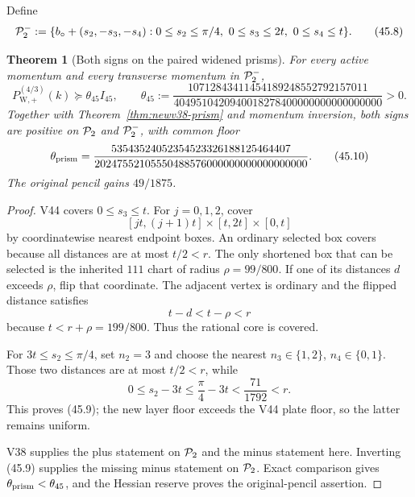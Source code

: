 \documentclass[11pt,oneside]{article}
\newtheorem{theorem}{Theorem}[section]
\theoremstyle{definition}
\theoremstyle{remark}
\begin{document}
Define
\[
 {\cal P}_{2}^{-}:=
 \{b_\circ+(s_2,-s_3,-s_4):
 0\le s_2\le\pi/4,\ 0\le s_3\le2t,\ 0\le s_4\le t\}.  \tag{45.8}
\]

\begin{theorem}[Both signs on the paired widened prisms]
\label{thm:newv45-paired-prisms}
For every active momentum and every transverse momentum in
\({\cal P}_2^-\),
\[
 P_{\mathrm W,+}^{(4/3)}(k)
 \succeq\theta_{45}I_{45},\qquad
 \theta_{45}:=
 \frac{10712843411454189248552792157011}
 {4049510420940018278400000000000000000}>0.            \tag{45.9}
\]
Together with Theorem~\ref{thm:newv38-prism} and momentum
inversion, both signs are positive on \({\cal P}_2\) and
\({\cal P}_2^-\), with common floor
\[
 \theta_{\rm prism}
 =\frac{53543524052354523326188125464407}
 {20247552105550488576000000000000000000}.             \tag{45.10}
\]
The original pencil gains \(49/1875\).
\end{theorem}

\begin{proof}
V44 covers \(0\le s_3\le t\).  For \(j=0,1,2\), cover
\[
 [jt,(j+1)t]\times[t,2t]\times[0,t]                   \tag{45.11}
\]
by coordinatewise nearest endpoint boxes.  An ordinary selected
box covers because all distances are at most \(t/2<r\).  The only
shortened box that can be selected is the inherited \(111\) chart
of radius \(\rho=99/800\).  If one of its distances \(d\) exceeds
\(\rho\), flip that coordinate.  The adjacent vertex is ordinary
and the flipped distance satisfies
\[
 t-d<t-\rho<r
\]
because \(t<r+\rho=199/800\).  Thus the rational core is covered.

For \(3t\le s_2\le\pi/4\), set \(n_2=3\) and choose the nearest
\(n_3\in\{1,2\}\), \(n_4\in\{0,1\}\).  Those two distances are at
most \(t/2<r\), while
\[
 0\le s_2-3t\le\frac{\pi}{4}-3t
 <\frac{71}{1792}<r.                                   \tag{45.12}
\]
This proves (45.9); the new layer floor exceeds the V44 plate
floor, so the latter remains uniform.

V38 supplies the plus statement on \({\cal P}_2\) and the minus
statement here.  Inverting (45.9) supplies the missing minus
statement on \({\cal P}_2\).  Exact comparison gives
\(\theta_{\rm prism}<\theta_{45}\), and the Hessian reserve proves
the original-pencil assertion.
\end{proof}
\end{document}
